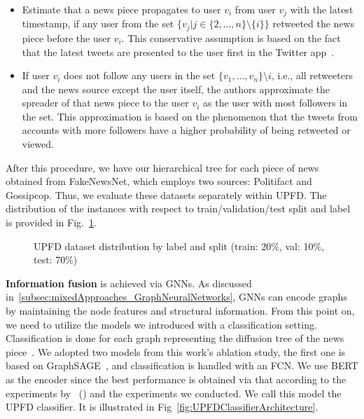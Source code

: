 \begin{itemize}
    \item Estimate that a news piece propagates to user $v_i$ from user $v_j$ with the latest timestamp, if any user from the set $\{v_j | j\in \{2, \dots, n\}\setminus \{i\}\}$ retweeted the news piece before the user $v_i$. This conservative assumption is based on the fact that the latest tweets are presented to the user first in the Twitter app~\parencite{UPFD_Dataset_Shu}.
    \item If user $v_i$ does not follow any users in the set $\{v_1, \dots, v_n \} \setminus {i}$, i.e., all retweeters and the news source except the user itself, the authors approximate the spreader of that news piece to the user $v_i$ as the user with most followers in the set. This approximation is based on the phenomenon that the tweets from accounts with more followers have a higher probability of being retweeted or viewed.
\end{itemize}
After this procedure, we have our hierarchical tree for each piece of news obtained from FakeNewsNet, which employs two sources: Politifact and Gossipcop. Thus, we evaluate these datasets separately within UPFD. The distribution of the instances with respect to train/validation/test split and label is provided in Fig.~\ref{fig:UPFD_Dataset_Visualization}.\\
\begin{figure}
    \hfill
    \caption[UPFD dataset distribution by label and split]{UPFD dataset distribution by label and split (train: 20\%, val: 10\%, test: 70\%)}
    \label{fig:UPFD_Dataset_Visualization}
\end{figure}
\textbf{Information fusion} is achieved via GNNs. As discussed in~\ref{subsec:mixedApproaches_GraphNeuralNetworks}, GNNs can encode graphs by maintaining the node features and structural information. From this point on, we need to utilize the models we introduced with a classification setting. Classification is done for each graph representing the diffusion tree of the news piece~\parencite{UPFD_Dataset_Shu}. We adopted two models from this work's ablation study, the first one is based on GraphSAGE~\parencite{GraphSAGE_Hamilton}, and classification is handled with an FCN. We use BERT as the encoder since the best performance is obtained via that according to the experiments by~\citeauthor{UPFD_Dataset_Shu} (\citeyear{UPFD_Dataset_Shu}) and the experiments we conducted. We call this model the UPFD classifier. It is illustrated in Fig~\ref{fig:UPFDClassifierArchitecture}.\\
